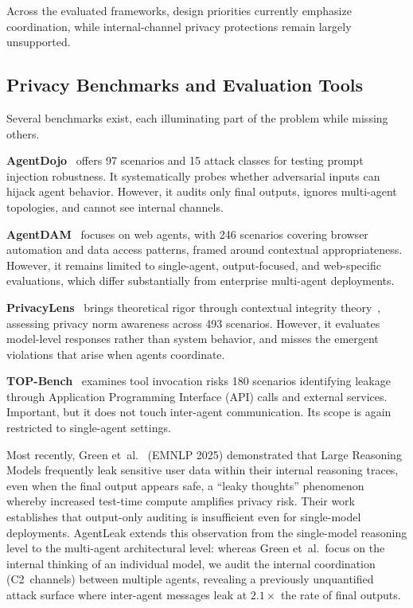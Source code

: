 \documentclass{ieeeaccess}
\begin{document}
Across the evaluated frameworks, design priorities currently emphasize coordination, while internal-channel privacy protections remain largely unsupported.

\subsection{Privacy Benchmarks and Evaluation Tools}

Several benchmarks exist, each illuminating part of the problem while missing others.

\textbf{AgentDojo}~\cite{debenedetti2024agentdojodynamicenvironmentevaluate} offers 97 scenarios and 15 attack classes for testing prompt injection robustness. It systematically probes whether adversarial inputs can hijack agent behavior. However, it audits only final outputs, ignores multi-agent topologies, and cannot see internal channels.

\textbf{AgentDAM}~\cite{zharmagambetov2025agentdamprivacyleakageevaluation} focuses on web agents, with 246 scenarios covering browser automation and data access patterns, framed around contextual appropriateness. However, it remains limited to single-agent, output-focused, and web-specific evaluations, which differ substantially from enterprise multi-agent deployments.

\textbf{PrivacyLens}~\cite{shao2025privacylensevaluatingprivacynorm} brings theoretical rigor through contextual integrity theory~\cite{nissenbaum2004privacy}, assessing privacy norm awareness across 493 scenarios. However, it evaluates model-level responses rather than system behavior, and misses the emergent violations that arise when agents coordinate.

\textbf{TOP-Bench}~\cite{qiao2025agenttoolsorchestrationleaks} examines tool invocation risks 180 scenarios identifying leakage through Application Programming Interface (API) calls and external services. Important, but it does not touch inter-agent communication. Its scope is again restricted to single-agent settings.

Most recently, Green et~al.~\cite{green2025leakythoughts} (EMNLP 2025) demonstrated that Large Reasoning Models frequently leak sensitive user data within their internal reasoning traces, even when the final output appears safe, a ``leaky thoughts'' phenomenon whereby increased test-time compute amplifies privacy risk. Their work establishes that output-only auditing is insufficient even for single-model deployments. AgentLeak extends this observation from the single-model reasoning level to the multi-agent architectural level: whereas Green et~al.\ focus on the internal thinking of an individual model, we audit the internal coordination (C2~channels) between multiple agents, revealing a previously unquantified attack surface where inter-agent messages leak at $2.1\times$ the rate of final outputs.
\end{document}
